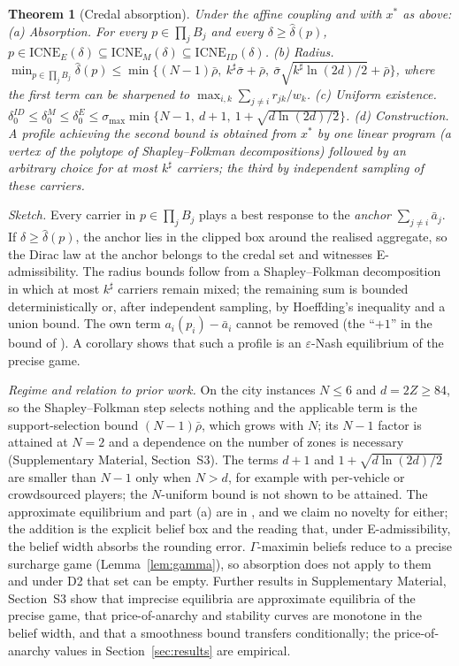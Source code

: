 \documentclass[preprint,11pt]{elsarticle}
\newtheorem{theorem}{Theorem}
\theoremstyle{definition}
\theoremstyle{remark}
\newcommand{\ICNE}{\mathrm{ICNE}}
\newcommand{\SM}[1]{Supplementary Material, Section~#1}
\begin{document}
\begin{theorem}[Credal absorption]\label{thm:main}
Under the affine coupling and with $x^*$ as above:
(a) \emph{Absorption.} For every $p\in\prod_jB_j$ and every $\delta\ge\hat\delta(p)$, $p\in\ICNE_E(\delta)\subseteq\ICNE_M(\delta)\subseteq\ICNE_{ID}(\delta)$.
(b) \emph{Radius.} $\min_{p\in\prod_jB_j}\hat\delta(p)\le\min\big\{(N-1)\bar\rho,\ k^\sharp\bar\sigma+\bar\rho,\ \bar\sigma\sqrt{k^\sharp\ln(2d)/2}+\bar\rho\big\}$, where the first term can be sharpened to $\max_{i,k}\sum_{j\ne i}r_{jk}/w_k$.
(c) \emph{Uniform existence.} $\delta_0^{ID}\le\delta_0^M\le\delta_0^E\le\sigma_{\max}\min\{N-1,\ d+1,\ 1+\sqrt{d\ln(2d)/2}\}$.
(d) \emph{Construction.} A profile achieving the second bound is obtained from $x^*$ by one linear program (a vertex of the polytope of Shapley--Folkman decompositions) followed by an arbitrary choice for at most $k^\sharp$ carriers; the third by independent sampling of these carriers.
\end{theorem}
\emph{Sketch.} Every carrier in $p\in\prod_jB_j$ plays a best response to the \emph{anchor} $\sum_{j\ne i}\bar a_j$. If $\delta\ge\hat\delta(p)$, the anchor lies in the clipped box around the realised aggregate, so the Dirac law at the anchor belongs to the credal set and witnesses E-admissibility. The radius bounds follow from a Shapley--Folkman decomposition in which at most $k^\sharp$ carriers remain mixed; the remaining sum is bounded deterministically or, after independent sampling, by Hoeffding's inequality and a union bound. The own term $a_i(p_i)-\bar a_i$ cannot be removed (the ``$+1$'' in the bound of \citealt{Liu2023}). A corollary shows that such a profile is an $\varepsilon$-Nash equilibrium of the precise game.

\emph{Regime and relation to prior work.} On the city instances $N\le6$ and $d=2Z\ge84$, so the Shapley--Folkman step selects nothing and the applicable term is the support-selection bound $(N-1)\bar\rho$, which grows with $N$; its $N-1$ factor is attained at $N=2$ and a dependence on the number of zones is necessary (\SM{S3}). The terms $d+1$ and $1+\sqrt{d\ln(2d)/2}$ are smaller than $N-1$ only when $N>d$, for example with per-vehicle or crowdsourced players; the $N$-uniform bound is not shown to be attained. The approximate equilibrium and part (a) are in \citet{Liu2023}, and we claim no novelty for either; the addition is the explicit belief box and the reading that, under E-admissibility, the belief width absorbs the rounding error. $\Gamma$-maximin beliefs reduce to a precise surcharge game (Lemma~\ref{lem:gamma}), so absorption does not apply to them and under D2 that set can be empty. Further results in \SM{S3} show that imprecise equilibria are approximate equilibria of the precise game, that price-of-anarchy and stability curves are monotone in the belief width, and that a smoothness bound transfers conditionally; the price-of-anarchy values in Section~\ref{sec:results} are empirical.
\end{document}
